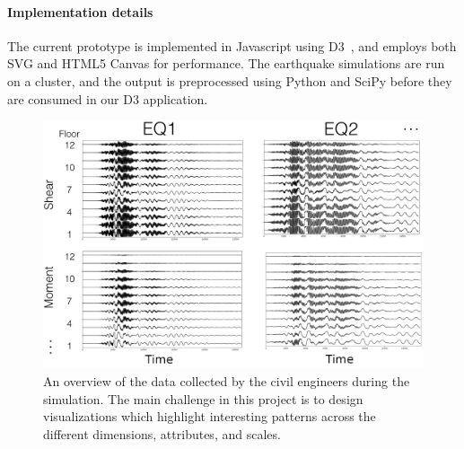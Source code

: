 \paragraph*{Implementation details}
The current prototype is implemented in Javascript using D3~\cite{Bostock:2011:DDD:2068462.2068631}, and employs both SVG and HTML5 Canvas for performance. The earthquake simulations are run on a cluster, and the output is preprocessed using Python and SciPy before they are consumed in our D3 application.


\begin{figure}[h]
	\centering %
	\includegraphics[width=\columnwidth]{figs/structure} 
	\caption{An overview of the data collected by the civil engineers during the simulation. The main challenge in this project is to design visualizations which highlight interesting patterns across the different dimensions, attributes, and scales.}
	\label{fig:data}
\end{figure}


